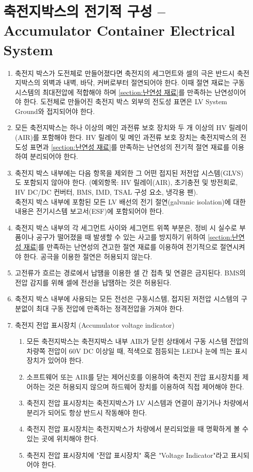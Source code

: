 \documentclass[final,a4paper,10pt]{report}
\begin{document}
\section{축전지박스의 전기적 구성 – Accumulator Container Electrical System}
\begin{enumerate}
  \item 축전지 박스가 도전체로 만들어졌다면 축전지의 세그먼트와 셀의 극은 반드시 축전지박스의 외벽과 내벽, 바닥, 커버로부터 절연되어야 한다. 이때 절연 재료는 구동시스템의 최대전압에 적합해야 하며 \cref{section:난연성 재료}를 만족하는 난연성이어야 한다. 도전체로 만들어진 축전지 박스 외부의 전도성 표면은 LV System Ground와 접지되어야 한다.
  \item 모든 축전지박스는 하나 이상의 메인 과전류 보호 장치와 두 개 이상의 HV 릴레이(AIR)를 포함해야 한다. HV 릴레이 및 메인 과전류 보호 장치는 축전지박스의 전도성 표면과 \cref{section:난연성 재료}를 만족하는 난연성의 전기적 절연 재료를 이용하여 분리되어야 한다.
  \item 축전지 박스 내부에는 다음 항목을 제외한 그 어떤 접지된 저전압 시스템(GLVS)도 포함되지 않아야 한다. (예외항목: HV 릴레이(AIR), 초기충전 및 방전회로, HV DC/DC 컨버터, BMS, IMD, TSAL 구성 요소, 냉각용 팬).\\
    축전지 박스 내부에 포함된 모든 LV 배선의 전기 절연(galvanic isolation)에 대한 내용은 전기시스템 보고서(ESF)에 포함되어야 한다.
  \item 축전지 박스 내부의 각 세그먼트 사이와 세그먼트 위쪽 부분은, 정비 시 실수로 부품이나 공구가 떨어졌을 때 발생할 수 있는 사고를 방지하기 위하여 \cref{section:난연성 재료}를 만족하는 난연성의 견고한 절연 재료를 이용하여 전기적으로 절연시켜야 한다. 공극을 이용한 절연은 허용되지 않는다.
  \item 고전류가 흐르는 경로에서 납땜을 이용한 셀 간 접촉 및 연결은 금지된다. BMS의 전압 감지를 위해 셀에 전선을 납땜하는 것은 허용된다.
  \item 축전지 박스 내부에 사용되는 모든 전선은 구동시스템, 접지된 저전압 시스템의 구분없이 최대 구동 전압에 만족하는 정격전압을 가져야 한다.
  
  \item 축전지 전압 표시장치 (Accumulator voltage indicator)
    \begin{enumerate}
      \item 모든 축전지박스는 축전지박스 내부 AIR가 닫힌 상태에서 구동 시스템 전압의 차량쪽 전압이 60V DC 이상일 때, 적색으로 점등되는 LED나 눈에 띄는 표시장치가 있어야 한다.
      \item 소프트웨어 또는 AIR를 닫는 제어신호를 이용하여 축전지 전압 표시장치를 제어하는 것은 허용되지 않으며 하드웨어 장치를 이용하여 직접 제어해야 한다.
      \item 축전지 전압 표시장치는 축전지박스가 LV 시스템과 연결이 끊기거나 차량에서 분리가 되어도 항상 반드시 작동해야 한다.
      \item 축전지 전압 표시장치는 축전지박스가 차량에서 분리되었을 때 명확하게 볼 수 있는 곳에 위치해야 한다.
      \item 축전지 전압 표시장치에 "전압 표시장치" 혹은 "Voltage Indicator"라고 표시되어야 한다.
    \end{enumerate}
\end{enumerate}
\end{document}
